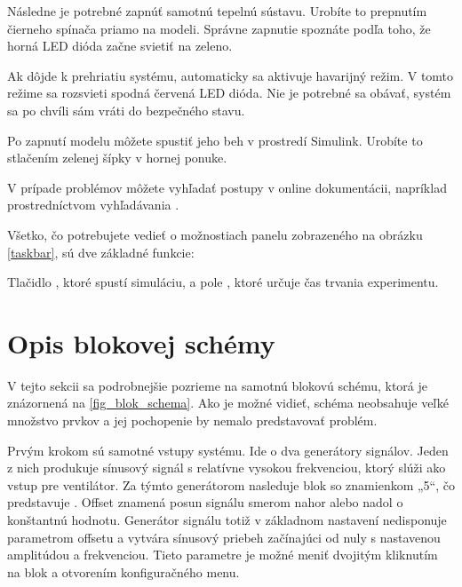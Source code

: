 \documentclass[a4paper, 10pt, ]{article}
\begin{document}
\noindent Následne je potrebné zapnúť samotnú tepelnú sústavu. Urobíte to prepnutím čierneho spínača priamo na modeli. Správne zapnutie spoznáte podľa toho, že horná LED dióda začne svietiť na zeleno.  

\noindent Ak dôjde k prehriatiu systému, automaticky sa aktivuje havarijný režim. V tomto režime sa rozsvieti spodná červená LED dióda. Nie je potrebné sa obávať, systém sa po chvíli sám vráti do bezpečného stavu.  

\noindent Po zapnutí modelu môžete spustiť jeho beh v prostredí Simulink. Urobíte to stlačením zelenej šípky v hornej ponuke.  

\noindent V prípade problémov môžete vyhľadať postupy v online dokumentácii, napríklad prostredníctvom vyhľadávania .  

\begin{center}
\vbox{%
\label{taskbar}
}%
\end{center}

\noindent Všetko, čo potrebujete vedieť o možnostiach panelu zobrazeného na obrázku \ref{taskbar}, sú dve základné funkcie:  

\noindent Tlačidlo , ktoré spustí simuláciu, a pole , ktoré určuje čas trvania experimentu.  



\section{Opis blokovej schémy}

\noindent V tejto sekcii sa podrobnejšie pozrieme na samotnú blokovú schému, ktorá je znázornená na \ref{fig_blok_schema}. Ako je možné vidieť, schéma neobsahuje veľké množstvo prvkov a jej pochopenie by nemalo predstavovať problém.

\begin{center}
\vbox{%
\label{fig_blok_schema}
}%
\end{center}

\noindent Prvým krokom sú samotné vstupy systému. Ide o dva generátory signálov. Jeden z nich produkuje sínusový signál s relatívne vysokou frekvenciou, ktorý slúži ako vstup pre ventilátor. Za týmto generátorom nasleduje blok so znamienkom „5“, čo predstavuje . Offset znamená posun signálu smerom nahor alebo nadol o konštantnú hodnotu. Generátor signálu totiž v základnom nastavení nedisponuje parametrom offsetu a vytvára sínusový priebeh začínajúci od nuly s nastavenou amplitúdou a frekvenciou. Tieto parametre je možné meniť dvojitým kliknutím na blok a otvorením konfiguračného menu.  
\end{document}
